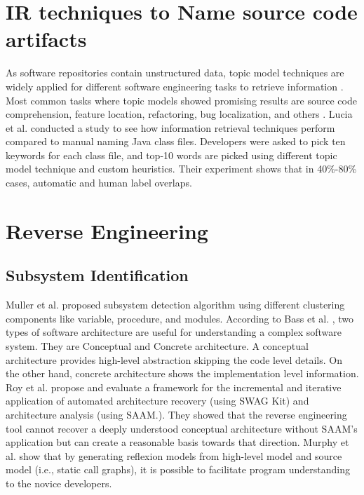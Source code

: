 \section{IR techniques to Name source code artifacts}
\label{related:IR}
As software repositories contain unstructured data, topic model techniques are widely applied for different software engineering tasks to retrieve information \cite{chen2016topicMiningRepositories, panichella2013topicModelsTasks, sun2016surveyTopicSE}. Most common tasks where topic models showed promising results are source code comprehension, feature location, refactoring, bug localization, and others \cite{sun2016surveyTopicSE}. Lucia et al. \cite{de2012IRMethodsArtifacts} conducted a study to see how information retrieval techniques perform compared to manual naming Java class files. Developers were asked to pick ten keywords for each class file, and top-10 words are picked using different topic model technique and custom heuristics. Their experiment shows that in 40\%-80\% cases, automatic and human label overlaps. 

\section{Reverse Engineering}
\label{related:reverse_engineering}
\subsection{Subsystem Identification}
Muller et al. \cite{muller1990composingSubsystemStructures} proposed subsystem detection algorithm using different clustering components like variable, procedure, and modules. 
According to Bass et al. \cite{bass2003softwareArchitecturePractice}, two types of software architecture are useful for understanding a complex software system. They are Conceptual and Concrete architecture. A conceptual architecture provides high-level abstraction skipping the code level details. On the other hand, concrete architecture shows the implementation level information. Roy et al. \cite{roy2008softwareArchitectureRecovery} propose and evaluate a framework for the incremental and iterative application of automated architecture recovery (using SWAG Kit) and architecture analysis (using SAAM.). They showed that the reverse engineering tool cannot recover a deeply understood conceptual architecture without SAAM's application but can create a reasonable basis towards that direction. Murphy et al.\cite{MurphyNotkin2001} show that by generating reflexion models from high-level model and source model (i.e., static call graphs), it is possible to facilitate program understanding to the novice developers. 

